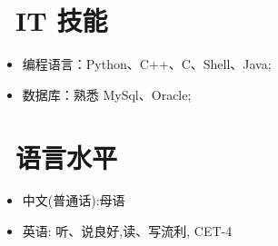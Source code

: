 \documentclass{resume}
\begin{document}





\section{\faCogs\ IT 技能}
\begin{itemize}[parsep=0.5ex]
  \item 编程语言：Python、C++、C、Shell、Java;
  \item 数据库：熟悉 MySql、Oracle;
\end{itemize}
\medskip


\section{\faLanguage\ 语言水平}
\begin{itemize}[parsep=0.5ex]
  \item 中文(普通话):母语
  \item 英语: 听、说良好,读、写流利, CET-4
\end{itemize}
\medskip
\end{document}
